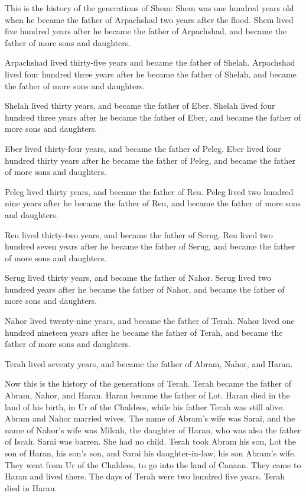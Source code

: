  This is the history of the generations of Shem: Shem was
one hundred years old when he became the father of Arpachshad two years
after the flood.  Shem lived five hundred years after he
became the father of Arpachshad, and became the father of more sons and
daughters.

 Arpachshad lived thirty-five years and became the father
of Shelah.  Arpachshad lived four hundred three years
after he became the father of Shelah, and became the father of more sons
and daughters.

 Shelah lived thirty years, and became the father of
Eber.  Shelah lived four hundred three years after he
became the father of Eber, and became the father of more sons and
daughters.

 Eber lived thirty-four years, and became the father of
Peleg.  Eber lived four hundred thirty years after he
became the father of Peleg, and became the father of more sons and
daughters.

 Peleg lived thirty years, and became the father of Reu.
 Peleg lived two hundred nine years after he became the
father of Reu, and became the father of more sons and daughters.

 Reu lived thirty-two years, and became the father of
Serug.  Reu lived two hundred seven years after he became
the father of Serug, and became the father of more sons and daughters.

 Serug lived thirty years, and became the father of
Nahor.  Serug lived two hundred years after he became the
father of Nahor, and became the father of more sons and daughters.

 Nahor lived twenty-nine years, and became the father of
Terah.  Nahor lived one hundred nineteen years after he
became the father of Terah, and became the father of more sons and
daughters.

 Terah lived seventy years, and became the father of
Abram, Nahor, and Haran.

 Now this is the history of the generations of Terah.
Terah became the father of Abram, Nahor, and Haran. Haran became the
father of Lot.  Haran died in the land of his birth, in
Ur of the Chaldees, while his father Terah was still alive.
 Abram and Nahor married wives. The name of Abram's wife
was Sarai, and the name of Nahor's wife was Milcah, the daughter of
Haran, who was also the father of Iscah.  Sarai was
barren. She had no child.  Terah took Abram his son, Lot
the son of Haran, his son's son, and Sarai his daughter-in-law, his son
Abram's wife. They went from Ur of the Chaldees, to go into the land of
Canaan. They came to Haran and lived there.  The days of
Terah were two hundred five years. Terah died in Haran.


